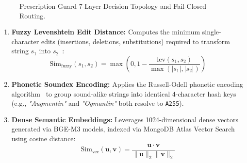\documentclass[11pt,a4paper]{article}
\begin{document}
\begin{figure}[htbp]
\caption{Prescription Guard 7-Layer Decision Topology and Fail-Closed Routing.}
\label{fig:guard_flow}
\end{figure}

\begin{enumerate}[leftmargin=*]
  \item \textbf{Fuzzy Levenshtein Edit Distance:}
  Computes the minimum single-character edits (insertions, deletions, substitutions) required to transform string $s_1$ into $s_2$~\cite{levenshtein1966binary}:
  \begin{equation}
    \text{Sim}_{\text{fuzzy}}(s_1, s_2) = \max\left(0, 1 - \frac{\text{lev}(s_1, s_2)}{\max(|s_1|, |s_2|)}\right)
  \end{equation}
  \item \textbf{Phonetic Soundex Encoding:}
  Applies the Russell-Odell phonetic encoding algorithm~\cite{russell1918soundex} to group sound-alike strings into identical 4-character hash keys (e.g., \textit{"Augmentin"} and \textit{"Ogmantin"} both resolve to \texttt{A255}).
  \item \textbf{Dense Semantic Embeddings:}
  Leverages 1024-dimensional dense vectors generated via BGE-M3 models, indexed via MongoDB Atlas Vector Search using cosine distance:
  \begin{equation}
    \text{Sim}_{\text{vec}}(\mathbf{u}, \mathbf{v}) = \frac{\mathbf{u} \cdot \mathbf{v}}{\|\mathbf{u}\|_2 \|\mathbf{v}\|_2}
  \end{equation}
\end{enumerate}
\end{document}
